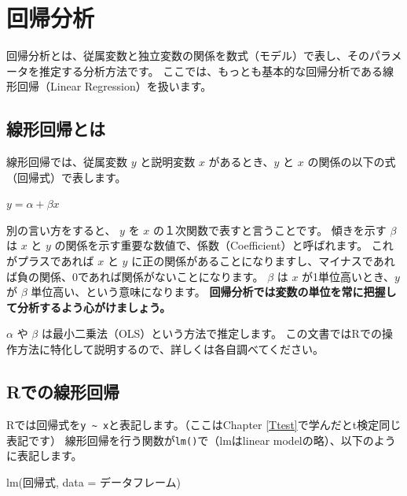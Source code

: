 \documentclass[
]{book}
\newenvironment{Shaded}{\begin{snugshade}}{\end{snugshade}}
\newcommand{\AttributeTok}[1]{\textcolor[rgb]{0.77,0.63,0.00}{#1}}
\newcommand{\FunctionTok}[1]{\textcolor[rgb]{0.00,0.00,0.00}{#1}}
\newcommand{\NormalTok}[1]{#1}
\begin{document}
\hypertarget{Regression}{%
\chapter{回帰分析}\label{Regression}}

回帰分析とは、従属変数と独立変数の関係を数式（モデル）で表し、そのパラメータを推定する分析方法です。
ここでは、もっとも基本的な回帰分析である線形回帰（Linear Regression）を扱います。

\hypertarget{ux7ddaux5f62ux56deux5e30ux3068ux306f}{%
\section{線形回帰とは}\label{ux7ddaux5f62ux56deux5e30ux3068ux306f}}

線形回帰では、従属変数 \(y\) と説明変数 \(x\) があるとき、\(y\) と \(x\) の関係の以下の式（回帰式）で表します。

\(y = \alpha + \beta x\)

別の言い方をすると、 \(y\) を \(x\) の１次関数で表すと言うことです。
傾きを示す \(\beta\) は \(x\) と \(y\) の関係を示す重要な数値で、係数（Coefficient）と呼ばれます。
これがプラスであれば \(x\) と \(y\) に正の関係があることになりますし、マイナスであれば負の関係、0であれば関係がないことになります。
\(\beta\) は \(x\) が1単位高いとき、\(y\) が \(\beta\) 単位高い、という意味になります。
\textbf{回帰分析では変数の単位を常に把握して分析するよう心がけましょう。}

\(\alpha\) や \(\beta\) は最小二乗法（OLS）という方法で推定します。
この文書ではRでの操作方法に特化して説明するので、詳しくは各自調べてください。

\hypertarget{rux3067ux306eux7ddaux5f62ux56deux5e30}{%
\section{Rでの線形回帰}\label{rux3067ux306eux7ddaux5f62ux56deux5e30}}

Rでは回帰式を\texttt{y\ \textasciitilde{}\ x}と表記します。（ここはChapter \ref{Ttest}で学んだとt検定同じ表記です）
線形回帰を行う関数が\texttt{lm()}で（lmはlinear modelの略）、以下のように表記します。

\begin{Shaded}
\begin{Highlighting}[]
\FunctionTok{lm}\NormalTok{(回帰式, }\AttributeTok{data =}\NormalTok{ データフレーム)}
\end{Highlighting}
\end{Shaded}
\end{document}
